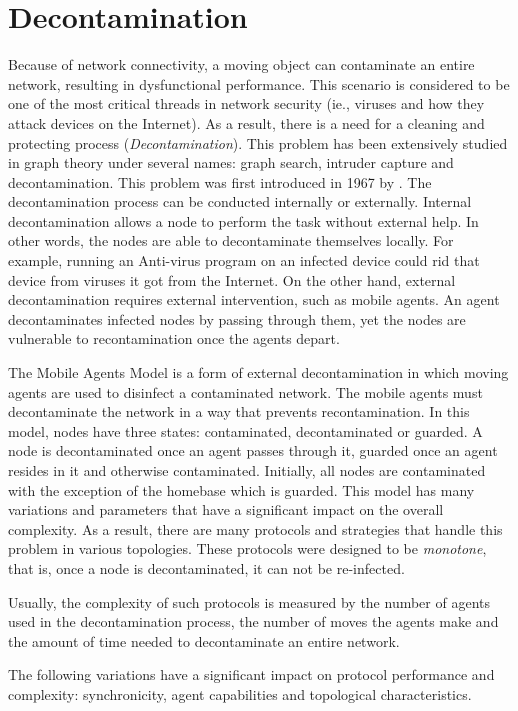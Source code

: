 \section{Decontamination}

Because of network connectivity, a moving object can contaminate an entire network, resulting in dysfunctional performance. This scenario is considered to be one of the most critical threads in network security (ie.,  viruses and how they attack devices on the Internet). As a result, there is a need for a cleaning and protecting process ({\em Decontamination}). This problem has been extensively studied in graph theory under several names: graph search, intruder capture and decontamination. This problem was first introduced in 1967 by \cite{bre4}. The decontamination process can be conducted internally or externally. Internal decontamination allows a node to perform the task without external help. In other words, the nodes are able to decontaminate themselves locally. For example, running an Anti-virus program on an infected device could rid that device from viruses it got from the Internet. On the other hand, external decontamination requires external intervention, such as mobile agents. An agent decontaminates infected nodes by passing through them, yet the nodes are vulnerable to recontamination once the agents depart. 


The Mobile Agents Model is a form of external decontamination in which moving agents are used to disinfect a contaminated network.
The mobile agents must decontaminate the network in a way that prevents recontamination. In this model, nodes have three states: contaminated, decontaminated or guarded. A node is decontaminated once an agent passes through it, guarded once an agent resides in it and otherwise contaminated. Initially, all nodes are contaminated with the exception of the homebase which is guarded. This model has many variations and parameters that have a significant impact on the overall complexity. As a result, there are many protocols and strategies that handle this problem in various topologies. These protocols were designed to be {\em monotone}, that is, once a node is decontaminated, it can not be re-infected.

Usually, the complexity of such protocols is measured by the number of agents used in the decontamination process, the number of moves the agents make and the amount of time needed to decontaminate an entire network.

The following variations have a significant impact on protocol performance and complexity: synchronicity, agent capabilities and topological characteristics.
